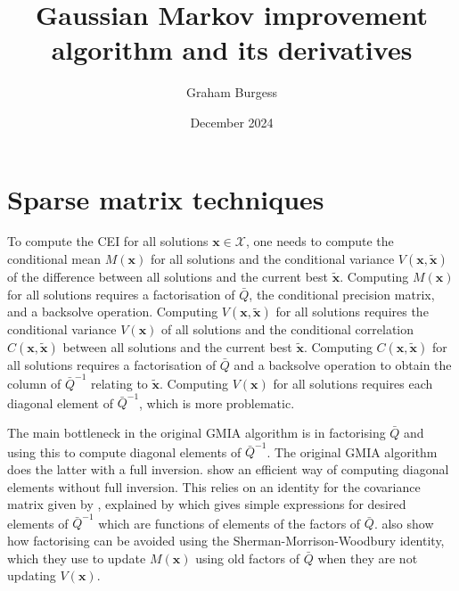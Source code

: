 \documentclass[12pt,a4paper]{article}
\title{Gaussian Markov improvement algorithm and its derivatives}
\author{Graham Burgess}
\date{December 2024}
\begin{document}
%
\maketitle

\section{Sparse matrix techniques}

To compute the CEI for all solutions $\boldsymbol{x} \in \mathcal{X}$, one needs to compute the conditional mean $M(\boldsymbol{x})$ for all solutions and the conditional variance $V(\boldsymbol{x},\tilde{\boldsymbol{x}})$ of the difference between all solutions and the current best $\tilde{\boldsymbol{x}}$. Computing $M(\boldsymbol{x})$ for all solutions requires a factorisation of $\bar{Q}$, the conditional precision matrix, and a backsolve operation. Computing $V(\boldsymbol{x},\tilde{\boldsymbol{x}})$ for all solutions requires the conditional variance $V(\boldsymbol{x})$ of all solutions and the conditional correlation $C(\boldsymbol{x},\tilde{\boldsymbol{x}})$ between all solutions and the current best $\tilde{\boldsymbol{x}}$. Computing $C(\boldsymbol{x},\tilde{\boldsymbol{x}})$ for all solutions requires a factorisation of $\bar{Q}$ and a backsolve operation to obtain the column of $\bar{Q}^{-1}$ relating to $\tilde{\boldsymbol{x}}$. Computing $V(\boldsymbol{x})$ for all solutions requires each diagonal element of $\bar{Q}^{-1}$, which is more problematic. 

The main bottleneck in the original GMIA algorithm is in factorising $\bar{Q}$ and using this to compute diagonal elements of $\bar{Q}^{-1}$. The original GMIA algorithm does the latter with a full inversion. \cite{semelhago2017computational} show an efficient way of computing diagonal elements without full inversion. This relies on an identity for the covariance matrix given by \cite{takahashi1973formation}, explained by \cite{vanhatalo2012modelling} which gives simple expressions for desired elements of $\bar{Q}^{-1}$ which are functions of elements of the factors of $\bar{Q}$. \cite{semelhago2017computational} also show how factorising can be avoided using the Sherman-Morrison-Woodbury identity, which they use to update $M(\boldsymbol{x})$ using old factors of $\bar{Q}$ when they are not updating $V(\boldsymbol{x})$. 

\newpage



\end{document}
